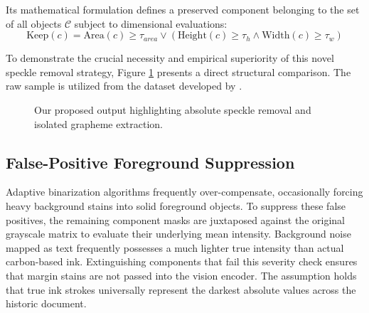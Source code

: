\documentclass[journal, onecolumn]{IEEEtran}
\begin{document}
Its mathematical formulation defines a preserved component belonging to the set of all objects $\mathcal{C}$ subject to dimensional evaluations:
\begin{equation}
\text{Keep}(c) = \text{Area}(c) \geq \tau_{area} \lor (\text{Height}(c) \geq \tau_{h} \land \text{Width}(c) \geq \tau_{w})
\end{equation}

To demonstrate the crucial necessity and empirical superiority of this novel speckle removal strategy, Figure \ref{fig:speckle_comparison} presents a direct structural comparison. The raw sample is utilized from the dataset developed by \cite{kausadikar2026}.

\begin{figure}[htbp]
\centering
\begin{minipage}{0.48\textwidth}
\centering
\vspace{6cm} %
\caption{Raw Modi script sample from the dataset introduced by Kausadikar et al. \cite{kausadikar2026}, exhibiting heavy background artifacts.}
\end{minipage}\hfill
\begin{minipage}{0.48\textwidth}
\centering
\vspace{6cm} %
\caption{Our proposed output highlighting absolute speckle removal and isolated grapheme extraction.}
\label{fig:speckle_comparison}
\end{minipage}
\end{figure}

\subsection{False-Positive Foreground Suppression}
Adaptive binarization algorithms frequently over-compensate, occasionally forcing heavy background stains into solid foreground objects. To suppress these false positives, the remaining component masks are juxtaposed against the original grayscale matrix to evaluate their underlying mean intensity. Background noise mapped as text frequently possesses a much lighter true intensity than actual carbon-based ink. Extinguishing components that fail this severity check ensures that margin stains are not passed into the vision encoder. The assumption holds that true ink strokes universally represent the darkest absolute values across the historic document.
\end{document}
